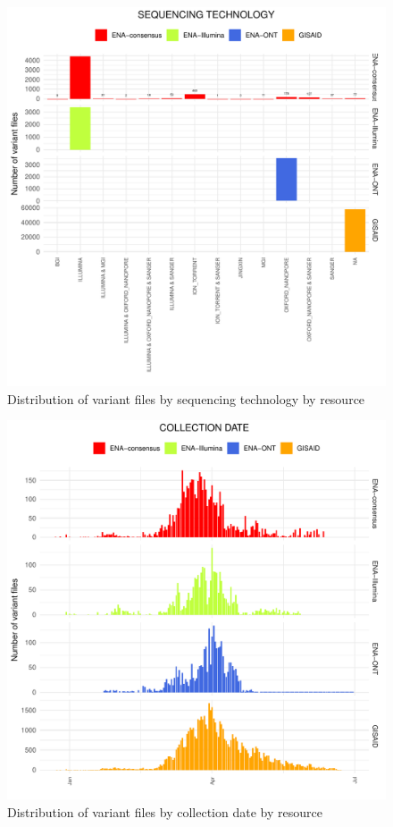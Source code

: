 \documentclass[a4paper, 10pt]{article}        %
\begin{document}
 
   \begin{figure}[!htb]
     \centering
       \includegraphics[width=1\textwidth]{all_plat_res_facet.pdf}
     \caption{Distribution of variant files by sequencing technology by resource}
     \label{fig:plat}
 \end{figure}

 

 
 



   \begin{figure}[!htb]
     \centering
       \includegraphics[width=1\textwidth]{all_date_res_facet.pdf}
     \caption{Distribution of variant files by collection date by resource}
     \label{fig:illu}
 \end{figure}
\end{document}
